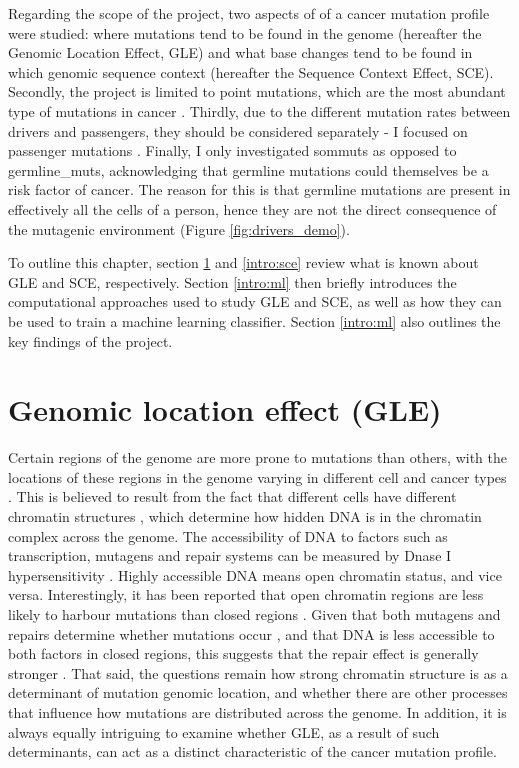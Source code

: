 Regarding the scope of the project, two aspects of of a cancer mutation profile were studied: where mutations tend to be found in the genome (hereafter the Genomic Location Effect, GLE) and what \gls{base} changes tend to be found in which genomic sequence context (hereafter the Sequence Context Effect, SCE). Secondly, the project is limited to point mutations, which are the most abundant type of mutations in cancer \citep{Alexandrov2020}. Thirdly, due to the different mutation rates between drivers and passengers, they should be considered separately - I focused on passenger mutations \citep{McFarland2014Tug-of-warProcesses}. Finally, I only investigated \glspl{sommut} as opposed to \glspl{germline_mut}, acknowledging that germline mutations could themselves be a risk factor of cancer. The reason for this is that germline mutations are present in effectively all the cells of a person, hence they are not the direct consequence of the mutagenic environment (Figure \ref{fig:drivers_demo}). 

To outline this chapter, section \ref{intro:gle} and \ref{intro:sce} review what is known about GLE and SCE, respectively. Section \ref{intro:ml} then briefly introduces the computational approaches used to study GLE and SCE, as well as how they can be used to train a machine learning classifier. Section \ref{intro:ml} also outlines the key findings of the project.

\section{Genomic location effect (GLE)}
\label{intro:gle}
Certain regions of the genome are more prone to mutations than others, with the locations of these regions in the genome varying in different cell and cancer types \citep{Polak2015, Jiao2020}. This is believed to result from the fact that different cells have different chromatin structures \citep{Abascal2020ExpandedGenomes}, which determine how hidden DNA is in the chromatin complex across the genome. The accessibility of DNA to factors such as transcription, mutagens and repair systems can be measured by Dnase I hypersensitivity \citep[DHS;][]{Liu2019AApplications}. Highly accessible DNA means open chromatin status, and vice versa. Interestingly, it has been reported that open chromatin regions are less likely to harbour mutations than closed regions \citep{Polak2015,Prendergast2007ChromatinGenome}. Given that both \glspl{mutagen} and repairs determine whether mutations occur \citep{Ripley2001Mutation}, and that DNA is less accessible to both factors in closed regions, this suggests that the repair effect is generally stronger \citep[Figure \ref{fig:chromatin_demo};][]{Teng1997ExcisionSequences, Morse2002PhotoreactivationCerevisiae}. That said, the questions remain how strong chromatin structure is as a determinant of mutation genomic location, and whether there are other processes that influence how mutations are distributed across the genome. In addition, it is always equally intriguing to examine whether GLE, as a result of such determinants, can act as a distinct characteristic of the cancer mutation profile. 

